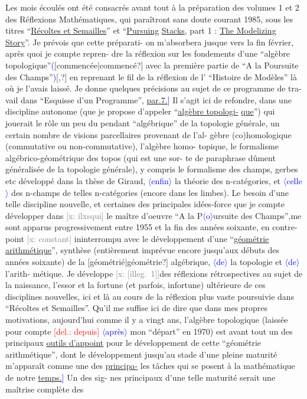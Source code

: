 \documentclass[11pt]{article}
\newcommand{\hand}[1]{\textcolor{blue}{#1}}
\newcommand{\inserted}[2][]{\textcolor{blue}{$\langle$#2$\rangle$}}
\newcommand{\deleted}[1]{\textcolor{red}{[\textsf{del.:} #1]}}
\newcommand{\xout}[1]{\textcolor{gray}{[\textsf{x:} #1]}}
\newcommand{\uline}[1]{\underline{#1}}
\newcommand{\unsure}[1]{[#1?]}
\newcommand{\illegible}[1]{[\textsf{illeg.\ #1}]}
\begin{document}
Les mois écoulés ont été consacrés avant tout à la préparation des
volumes 1 et 2 des Réflexions Mathématiques, qui paraîtront sans doute
courant 1985, sous les titres ``\uline{Récoltes et Semailles}'' et ``\uline{Pursuing}
\uline{Stacks,} part 1 : \uline{The Modelizing Story}''. Je prévois que cette préparati-%
on m'absorbera jusque vers la fin février, après quoi je compte repren-%
dre la réflexion sur les fondements d'une ``algèbre topologique''\hand{(}\unsure{commencée|commencé}
avec la première partie de ``A la Poursuite des Champs''\hand{)}\unsure{,} en reprenant
le fil de la réflexion de l' ``Histoire de Modèles'' là où je l'avais
laissé. Je donne quelques précisions au sujet de ce programme de tra-%
vail dans ``Esquisse d'un Programme'', \uline{par.7.}\hand{]} Il s'agit ici de refondre,
dans une discipline autonome (que je propose d'appeler ``\uline{algèbre topologi-}%
\uline{que}'') qui jouerait le rôle un peu du pendant ``algébrique'' de la topologie
générale, un certain nombre de visions parcellaires provenant de l'al-%
gèbre (co)homologique (commutative ou non-commutative), l'algèbre homo-%
topique, le formalisme algébrico-géométrique des topos (qui est une sor-%
te de paraphrase dûment généralisée de la topologie générale), y compris
le formalisme des champs, gerbes etc développé dans la thèse de Giraud,
\inserted{enfin} la théorie des n-catégories\hand{,} et \inserted{celle} des n-champs de telles n-catégories
(encore dans les limbes). Le besoin d'une telle discipline nouvelle,
et certaines des principales idées-force que je compte développer dans
\xout{ilxsqui} le maître d'oeuvre ``A la P\inserted{o}ursuite des Champs'',me sont apparus
progressivement entre 1955 et la fin des années soixante, en contre-%
point \xout{constant} ininterrompu avec le développement d'une ``\uline{géométrie}
\uline{arithmétique}'', synthèse (entièrement imprévue encore jusqu'aux débuts
des années soixante) de la \unsure{géométrié|géométrie} algébrique, \inserted{de} la topologie et \inserted{de} l'arith-%
métique. Je développe \xout{\illegible{1}}des réflexions rétrospectives au sujet de
la naissance, l'essor et la fortune (et parfois, infortune) ultérieure
de ces disciplines nouvelles, ici et là au cours de la réflexion plus
vaste poursuivie dans ``Récoltes et Semailles''. Qu'il me suffise ici de
dire que dans mes propres motivations, aujourd'hui comme il y a vingt
ans, l'algèbre topologique (laissée pour compte \deleted{depuis} \inserted{après} mon ``départ''
en 1970) est avant tout un des principaux \uline{outils d'appoint} pour le
développement de cette ``géométrie arithmétique'', dont le développement
jusqu'au stade d'une pleine maturité m'apparaît comme une des \uline{principa-}%
les tâches qui se posent à la mathématique de notre \uline{temps.}\hand{]} Un des sig-%
nes principaux d'une telle maturité serait une maîtrise complète des
\end{document}
